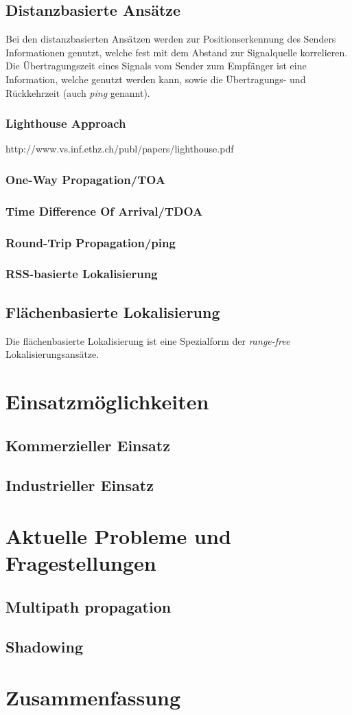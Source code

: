\documentclass[12pt, a4wide]{scrreprt}
\begin{document}
  \section{Distanzbasierte Ansätze}
Bei den distanzbasierten Ansätzen werden zur Positionserkennung des Senders Informationen genutzt, welche fest mit dem Abstand zur Signalquelle korrelieren. Die Übertragungszeit eines Signals vom Sender zum Empfänger ist eine Information, welche genutzt werden kann, sowie die Übertragungs- und Rückkehrzeit (auch \textit{ping} genannt).
    \subsection{Lighthouse Approach}
    http://www.vs.inf.ethz.ch/publ/papers/lighthouse.pdf
    \subsection{One-Way Propagation/TOA}
    \subsection{Time Difference Of Arrival/TDOA}
    \subsection{Round-Trip Propagation/ping}
    \subsection{RSS-basierte Lokalisierung}    
  \section{Flächenbasierte Lokalisierung}
Die flächenbasierte Lokalisierung ist eine Spezialform der \textit{range-free} Lokalisierungsansätze.
\chapter{Einsatzmöglichkeiten}
  \section{Kommerzieller Einsatz}
  \section{Industrieller Einsatz}

\chapter{Aktuelle Probleme und Fragestellungen}
  \section{Multipath propagation}
  \section{Shadowing}

\chapter{Zusammenfassung}

%

\pagestyle{empty}
\begin{multicols}{2}

\nocite{*}
\end{multicols}
\end{document}
